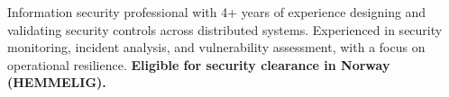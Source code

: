 



\vspace{6pt}

\begin{cvparagraph}
Information security professional with 4+ years of experience designing and validating security controls across distributed systems. Experienced in security monitoring, incident analysis, and vulnerability assessment, with a focus on operational resilience. \textbf{Eligible for security clearance in Norway (HEMMELIG).}
\end{cvparagraph}

\vspace{2mm}

